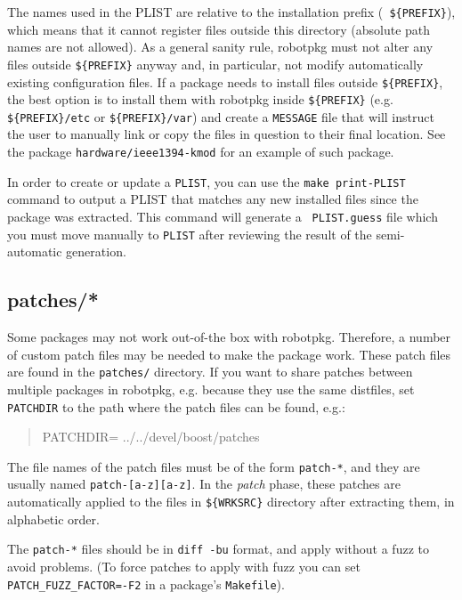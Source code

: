 The  names used  in the  PLIST are  relative to  the installation  prefix ({\tt
\$\{PREFIX\}}),  which  means  that  it  cannot  register  files  outside  this
directory  (absolute path names  are not  allowed). As  a general  sanity rule,
robotpkg must  not alter  any files outside  {\tt \$\{PREFIX\}} anyway  and, in
particular, not modify automatically existing configuration files. If a package
needs  to install  files  outside {\tt  \$\{PREFIX\}},  the best  option is  to
install   them   with   robotpkg   inside  {\tt   \$\{PREFIX\}}   (e.g.    {\tt
\$\{PREFIX\}/etc} or  {\tt \$\{PREFIX\}/var}) and  create a {\tt  MESSAGE} file
that will instruct the  user to manually link or copy the  files in question to
their final location. See the package {\tt hardware/ieee1394-kmod} for an
example of such package.

In  order to  create  or  update a  {\tt  PLIST}, you  can  use  the {\tt  make
print-PLIST} command  to output  a PLIST that  matches any new  installed files
since  the  package   was  extracted.   This  command  will   generate  a  {\tt
PLIST.guess} file which  you must move manually to  {\tt PLIST} after reviewing
the result of the semi-automatic generation.


\subsection{patches/*} %
\label{subsection:patches}

Some packages may not work out-of-the box with robotpkg. Therefore, a number of
custom patch  files may be needed to  make the package work.  These patch files
are found in the {\tt patches/} directory. If you want to share patches between
multiple packages  in robotpkg, e.g. because  they use the  same distfiles, set
{\tt PATCHDIR} to the path where the patch files can be found, e.g.:
\begin{quote}
   PATCHDIR= ../../devel/boost/patches
\end{quote}

The file names of the patch files must be of the form {\tt patch-*}, and they
are usually named {\tt patch-[a-z][a-z]}. In  the {\em  patch} phase,  these
patches  are automatically applied  to the  files  in {\tt \$\{WRKSRC\}}
directory after extracting them, in alphabetic order.

The {\tt patch-*} files should be in {\tt diff -bu} format, and apply without a
fuzz to avoid problems.  (To force patches to apply with fuzz  you can set {\tt
PATCH\_FUZZ\_FACTOR=-F2} in a package's {\tt Makefile}).

